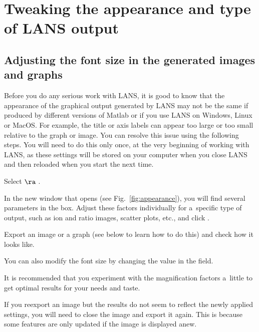 \section{Tweaking the appearance and type of LANS output}
\label{sec:appearance}

\subsection{Adjusting the font size in the generated images and graphs}
\setcounter{step}{0}

\goldbox{}
Before you do any serious work with LANS, it is good to know that the appearance of the graphical output generated by LANS may not be the same if produced by different versions of Matlab or if you use LANS on Windows, Linux or MacOS. For example, the title or axis labels can appear too large or too small relative to the graph or image. You can resolve this issue using the following steps. You will need to do this only once, at the very beginning of working with LANS, as these settings will be stored on your computer when you close LANS and then reloaded when you start the next time. 
\tcbe

\s Select  $\ra$ .

\s In the new window that opens (see Fig.~\ref{fig:appearance}), you will find several parameters in the    box. Adjust these factors individually for a~specific type of output, such as ion and ratio images, scatter plots, etc., and click .

\s Export an image or a graph (see below to learn how to do this) and check how it looks like.

\s You can also modify the font size by changing the value in the  field.

\bul It is recommended that you experiment with the magnification factors a~little to get optimal results for your needs and taste. 

\bul If you reexport an image but the results do not seem to reflect the newly applied settings, you will need to close the image and export it again. This is because some features are only updated if the image is displayed anew.

